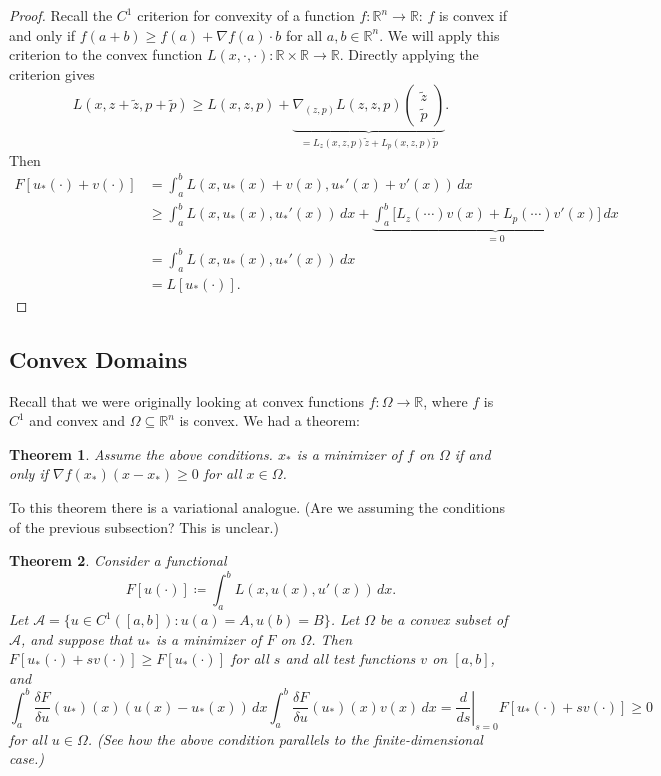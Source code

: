 \documentclass[11pt]{article}
\newcommand{\R}{\mathbb{R}}
\renewcommand{\tilde}{\widetilde}
\newtheorem{theorem}{Theorem}[section]
\begin{document}
\begin{proof}
Recall the $C^1$ criterion for convexity of a function $f : \R^n \to \R$: $f$ is convex if and only if $f(a + b) \geq f(a) + \nabla f(a) \cdot b$ for all $a,b \in \R^n$. We will apply this criterion to the convex function $L(x, \cdot, \cdot) : \R \times \R \to \R$. Directly applying the criterion gives
\[
L(x, z + \tilde{z}, p + \tilde{p}) \geq L(x,z,p) + \underbrace{\nabla_{(z,p)}L(z,z,p) \begin{pmatrix}
\tilde{z} \\ \tilde{p}
\end{pmatrix}}_{=L_z(x,z,p)\tilde{z} + L_p(x,z,p)\tilde{p}}.
\]
Then
\begin{align*}
F[u_*(\cdot) + v(\cdot)] &= \int_a^b L(x, u_*(x) + v(x), u_*'(x) + v'(x)) \, dx \\
&\geq \int_a^b L(x, u_*(x), u_*'(x)) \, dx +  \underbrace{\int_a^b \Bigg[ L_z(\cdots)v(x) + L_p(\cdots)v'(x) \Bigg] \, dx}_{=0} \\
&= \int_a^b L(x, u_*(x), u_*'(x)) \, dx \\
&= L[u_*(\cdot)].
\end{align*}
\end{proof}

\subsection{Convex Domains}

Recall that we were originally looking at convex functions $f : \Omega \to \R$, where $f$ is $C^1$ and convex and $\Omega \subseteq \R^n$ is convex. We had a theorem:
\begin{theorem}
Assume the above conditions. $x_*$ is a minimizer of $f$ on $\Omega$ if and only if $\nabla f(x_*)(x - x_*) \geq 0$ for all $x \in \Omega$.
\end{theorem}
To this theorem there is a variational analogue. (Are we assuming the conditions of the previous subsection? This is unclear.)
\begin{theorem}
Consider a functional
\[
F[u(\cdot)] \coloneqq \int_a^b L(x, u(x), u'(x)) \, dx.
\]
Let $\mathcal{A} = \{ u \in C^1([a, b]) : u(a) = A, u(b) = B \}$. Let $\Omega$ be a convex subset of $\mathcal{A}$, and suppose that $u_*$ is a minimizer of $F$ on $\Omega$. Then $F[u_*(\cdot) + sv(\cdot)] \geq F[u_*(\cdot)]$ for all $s$ and all test functions $v$ on $[a, b]$, and
\[
\int_a^b \frac{\delta F}{\delta u}(u_*)(x)(u(x) - u_*(x))\, dx \int_a^b \frac{\delta F}{\delta u}(u_*)(x)v(x)\,dx = \left. \frac{d}{ds} \right|_{s=0} F[u_*(\cdot) + sv(\cdot)] \geq 0
\]
for all $u \in \Omega$. (See how the above condition parallels to the finite-dimensional case.)
\end{theorem}
\end{document}
